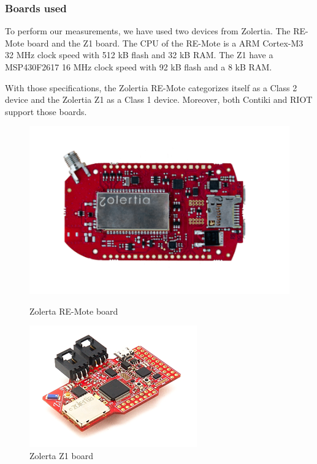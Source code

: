 \subsubsection{Boards used}

To perform our measurements, we have used two devices from Zolertia.
The RE-Mote board\cite{zolertia-remote} and the Z1 board\cite{zolertia-z1}.
The CPU of the RE-Mote is a ARM Cortex-M3\cite{arm-cortex-m3} 32 MHz clock speed with 512 kB flash and 32 kB RAM.
The Z1 have a MSP430F2617\cite{msp430} 16 MHz clock speed with 92 kB flash and a 8 kB RAM.

With those specifications, the Zolertia RE-Mote categorizes itself as a Class 2 device and the Zolertia Z1 as a Class 1 device.
Moreover, both Contiki and RIOT support those boards.

\begin{figure}[!ht]
    \begin{minipage}{.45\textwidth}
        \centering
        \includegraphics[scale=.5]{assets/remote.png}
        \caption{Zolerta RE-Mote board}
    \end{minipage}\hfill
    \begin{minipage}{.45\textwidth}        
        \centering
        \includegraphics[scale=2.5]{assets/z1.png}
        \caption{Zolerta Z1 board}
    \end{minipage}
\end{figure}

